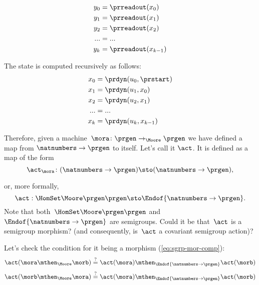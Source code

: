 \begin{equation}
    \label{eq:actions-on-sequences-y}
    \begin{aligned}
        y_0 &= \prreadout(x_0) \\
        y_1 &= \prreadout(x_1) \\
        y_2 &= \prreadout(x_2) \\
        ... &= ...  \\
        y_{k} &= \prreadout(x_{k-1})
    \end{aligned}
\end{equation}

The state is computed recursively as follows:
\begin{equation}
    \label{eq:actions-on-sequences-x}
    \begin{aligned}
        x_0 &= \prdyn(u_0, \prstart) \\
        x_1 &= \prdyn(u_1, x_0) \\
        x_2 &= \prdyn(u_2, x_1) \\
        ... &= ... \\
        x_{k} &= \prdyn(u_{k}, x_{k-1})
    \end{aligned}
\end{equation}

Therefore, given a machine~$\mora \colon \prgen \to_{\Moore} \prgen$ we have defined a map from $\natnumbers \to \prgen$ to itself. Let's call it $\act$. It is defined as a map of the form
%
\begin{equation}
    \label{eq:actions-on-sequences-1}
    \act_{\mora}\colon  (\natnumbers \to \prgen)  \sto  (\natnumbers \to \prgen),
\end{equation}

%
or, more formally,
%
\begin{equation}
    \label{eq:actions-on-sequences-2}
    \act: \HomSet\Moore\prgen\prgen \sto \Endof {\natnumbers \to \prgen}.
\end{equation}
%
Note that both~$\HomSet\Moore\prgen\prgen$ and $\Endof {\natnumbers \to \prgen}$ are semigroups.
Could it be that~$\act$ is a semigroup morphism? (and consequently, is~$\act$ a covariant semigroup action)?

Let's check the condition for it being a morphism (\cref{eq:sgrp-mor-comp}):
%
\begin{equation}
    \label{eq:actions-on-sequences-left}
    \act ( \mora \mthen_{\Moore} \morb) \stackrel{?}{=}  \act ( \mora) \mthen_{\Endof  {\natnumbers \to \prgen}} \act(\morb)
\end{equation}
%
\begin{equation}
    \label{eq:actions-on-sequences-right}
    \act ( \morb \mthen_{\Moore} \mora) \stackrel{?}{=}  \act ( \mora) \mthen_{\Endof  {\natnumbers \to \prgen}} \act(\morb)
\end{equation}

